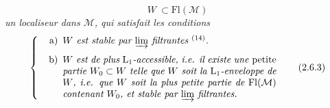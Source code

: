 \documentclass[11pt]{article}
\newcommand{\printedpage}[1]{\marginpar{\footnotesize p.~#1}}
\newcommand{\Fl}{\mathrm{Fl}}
\begin{document}
\[ W \ \subset \Fl(\mathcal{M}) \tag*{(2.6.2)} \]
\textit{un localiseur dans $\mathcal{M}$, qui satisfait les conditions}
\[ \left\{ \begin{minipage}{0.72\textwidth}\itshape
\begin{itemize}[leftmargin=2.5em]
\item[\upshape a)] $W$ est stable par $\varinjlim$ filtrantes $^{\textup{(14)}}$.
\item[\upshape b)] $W$ est de plus $\mathrm{L}_1$-accessible, i.e. il existe une \textup{petite} partie $W_0 \subset W$ telle que $W$ soit la $\mathrm{L}_1$-enveloppe de $W$, i.e. que $W$ soit la plus petite partie de $\Fl(\mathcal{M})$ contenant $W_0$, et stable par $\varinjlim$ filtrantes. %
\end{itemize}
\end{minipage}\right. \tag*{(2.6.3)} \]

\printedpage{16}
\end{document}
